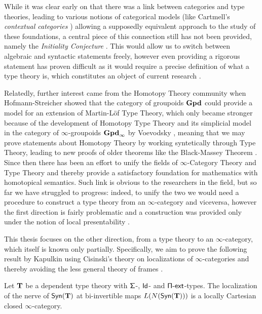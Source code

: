 \noindent
While it was clear early on that there was a link between categories and type
theories, leading to various notions of categorical models (like
Cartmell's \emph{contextual categories} \cite{Car78}) allowing a supposedly
equivalent approach to the study of these foundations, a central piece of this
connection still has not been provided, namely the \emph{Initiality Conjecture}
\cite{Str91}.
This would allow us to switch between algebraic and syntactic statements freely,
however even providing a rigorous statement has proven difficult as it would
require a precise definition of what a type theory is, which constitutes an
object of current research \cite{BHL20}.

\noindent
Relatedly, further interest came from the Homotopy Theory community when
Hofmann-Streicher \cite{HS98} showed that the category of groupoids $\operatorname{\mathbf{Gpd}}$ could
provide a model for an extension of Martin-L{\"o}f Type Theory, which only
became stronger because of the development of Homotopy Type Theory and its
simplicial model in the category of $\infty$-groupoids $\operatorname{\mathbf{Gpd}_\infty}$ by
Voevodsky \cite{KL12}, meaning that we may prove statements about Homotopy
Theory by working syntetically through Type Theory, leading to new proofs of
older theorems like the Black-Massey Theorem \cite{HFLL16}. Since then there has
been an effort to unify the
fields of $\infty$-Category Theory and Type Theory and thereby provide a
satisfactory foundation for mathematics with homotopical semantics. Such link is
obvious to the researchers in the field, but so far we have struggled to
progress: indeed, to unify the two we would need a procedure to construct a type
theory from an $\infty$-category and viceversa, however the first direction is
fairly problematic and a construction was provided only under the notion of
local presentability \cite{Shu14}.

\noindent
This thesis focuses on the other direction, from a type theory to an
$\infty$-category, which itself is known only partially. Specifically, we aim to
prove the following result by Kapulkin \cite[Thm.\ 9.3.17]{Kap14} using
Cisinski's theory on localizations of $\infty$-categories \cite{Cis19} and
thereby avoiding the less general theory of frames \cite{Szu14,KS15}.

\begin{finalthm}
  Let $\operatorname{\mathbf{T}}$ be a dependent type theory with $\operatorname{\mathsf{\Sigma}}$-, $\operatorname{\mathsf{Id}}$- and
  $\operatorname{\mathsf{\Pi-ext}}$-types. The localization of the nerve of $\mathsf{Syn}(\mathbf{T})$ at bi-invertible
  maps $L(N(\mathsf{Syn}(\mathbf{T})))$ is a locally Cartesian closed $\infty$-category.
\end{finalthm}

